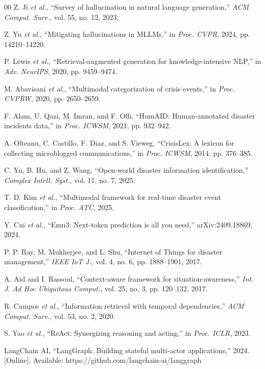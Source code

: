 \documentclass[conference]{IEEEtran}
\begin{document}
\begin{thebibliography}{00}
 Z. Ji \textit{et al.}, ``Survey of hallucination in natural language generation,'' \textit{ACM Comput. Surv.}, vol. 55, no. 12, 2023.

 Z. Yu \textit{et al.}, ``Mitigating hallucinations in MLLMs,'' in \textit{Proc. CVPR}, 2024, pp. 14210--14220.

 P. Lewis \textit{et al.}, ``Retrieval-augmented generation for knowledge-intensive NLP,'' in \textit{Adv. NeurIPS}, 2020, pp. 9459--9474.

 M. Abavisani \textit{et al.}, ``Multimodal categorization of crisis events,'' in \textit{Proc. CVPRW}, 2020, pp. 2650--2659.

 F. Alam, U. Qazi, M. Imran, and F. Ofli, ``HumAID: Human-annotated disaster incidents data,'' in \textit{Proc. ICWSM}, 2021, pp. 932--942.

 A. Olteanu, C. Castillo, F. Diaz, and S. Vieweg, ``CrisisLex: A lexicon for collecting microblogged communications,'' in \textit{Proc. ICWSM}, 2014, pp. 376--385.

 C. Yu, B. Hu, and Z. Wang, ``Open-world disaster information identification,'' \textit{Complex Intell. Syst.}, vol. 11, no. 7, 2025.

 T. D. Kim \textit{et al.}, ``Multimodal framework for real-time disaster event classification,'' in \textit{Proc. ATC}, 2025.

 Y. Cui \textit{et al.}, ``Emu3: Next-token prediction is all you need,'' arXiv:2409.18869, 2024.

 P. P. Ray, M. Mukherjee, and L. Shu, ``Internet of Things for disaster management,'' \textit{IEEE IoT J.}, vol. 4, no. 6, pp. 1888--1901, 2017.

 A. Aid and I. Rassoul, ``Context-aware framework for situation-awareness,'' \textit{Int. J. Ad Hoc Ubiquitous Comput.}, vol. 25, no. 3, pp. 120--132, 2017.

 R. Campos \textit{et al.}, ``Information retrieval with temporal dependencies,'' \textit{ACM Comput. Surv.}, vol. 53, no. 2, 2020.

 S. Yao \textit{et al.}, ``ReAct: Synergizing reasoning and acting,'' in \textit{Proc. ICLR}, 2023.

 LangChain AI, ``LangGraph: Building stateful multi-actor applications,'' 2024. [Online]. Available: https://github.com/langchain-ai/langgraph


\end{thebibliography}
\end{document}
